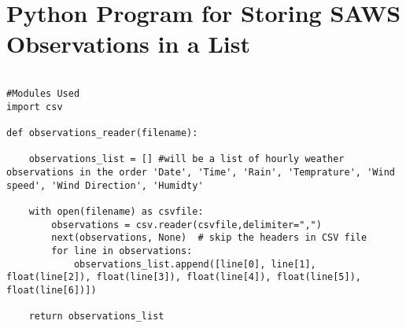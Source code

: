 \chapter{Python Program for Storing SAWS Observations in a List} %

\label{AppendixA} %

\begin{lstlisting}

#Modules Used
import csv

def observations_reader(filename):

    observations_list = [] #will be a list of hourly weather observations in the order 'Date', 'Time', 'Rain', 'Temprature', 'Wind speed', 'Wind Direction', 'Humidty' 

    with open(filename) as csvfile:
        observations = csv.reader(csvfile,delimiter=",")
        next(observations, None)  # skip the headers in CSV file
        for line in observations:
            observations_list.append([line[0], line[1], float(line[2]), float(line[3]), float(line[4]), float(line[5]), float(line[6])])

    return observations_list
    

\end{lstlisting}